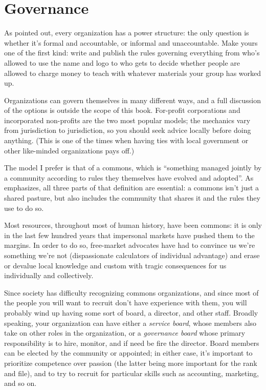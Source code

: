 \section{Governance}\label{s:community-governance}

As \cite{Free1972} pointed out, every organization has a power
structure: the only question is whether it's formal and accountable, or
informal and unaccountable. Make yours one of the first kind: write and
publish the rules governing everything from who's allowed to use the
name and logo to who gets to decide whether people are allowed to charge
money to teach with whatever materials your group has worked up.

Organizations can govern themselves in many different ways, and a full
discussion of the options is outside the scope of this book. For-profit
corporations and incorporated non-profits are the two most popular models;
the mechanics vary from jurisdiction to jurisdiction, so you should seek
advice locally before doing anything. (This is one of the times when
having ties with local government or other like-minded organizations
pays off.)

The model I prefer is that of a commons, which is ``something managed
jointly by a community according to rules they themselves have evolved
and adopted''. As \cite{Boll2014} emphasizes, all three parts of that
definition are essential: a commons isn't just a shared pasture, but
also includes the community that shares it and the rules they use to do
so.

Most resources, throughout most of human history, have been commons: it
is only in the last few hundred years that impersonal markets have
pushed them to the margins. In order to do so, free-market advocates
have had to convince us we're something we're not (dispassionate
calculators of individual advantage) and erase or devalue local
knowledge and custom with tragic consequences for us individually and
collectively.

Since society has difficulty recognizing commons organizations, and
since most of the people you will want to recruit don't have experience
with them, you will probably wind up having some sort of board, a
director, and other staff. Broadly speaking, your organization can have
either a \emph{service board}, whose members also take on other roles in the
organization, or a \emph{governance board} whose primary responsibility is to
hire, monitor, and if need be fire the director. Board members can be
elected by the community or appointed; in either case, it's important to
prioritize competence over passion (the latter being more important for
the rank and file), and to try to recruit for particular skills such as
accounting, marketing, and so on.


